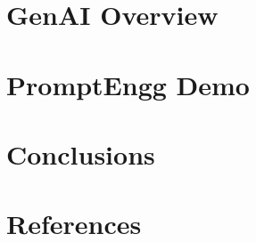 \section[GenAI]{GenAI Overview}


\section[Demo]{PromptEngg Demo}


\section[Concl]{Conclusions}


\section[Refs]{References}
